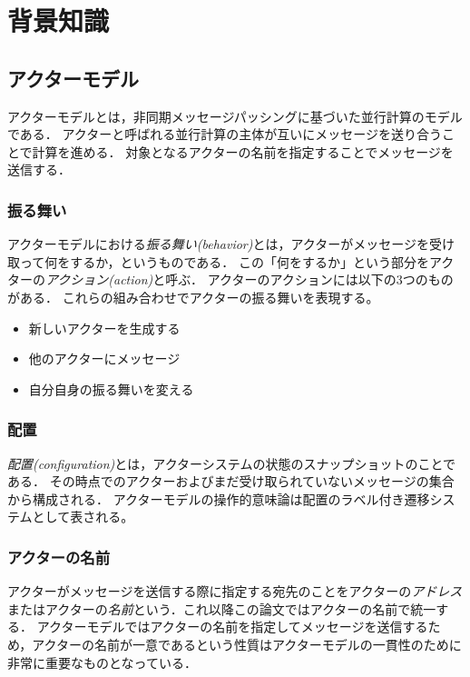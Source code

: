 \chapter{背景知識}
\label{chapter:background}

\section{アクターモデル}

アクターモデル\cite{Agha:1986aa}とは，非同期メッセージパッシングに基づいた並行計算のモデルである．
アクターと呼ばれる並行計算の主体が互いにメッセージを送り合うことで計算を進める．
対象となるアクターの名前を指定することでメッセージを送信する．


\subsection{振る舞い}

アクターモデルにおける\emph{振る舞い(behavior)}とは，アクターがメッセージを受け取って何をするか，というものである．
この「何をするか」という部分をアクターの\emph{アクション(action)}と呼ぶ．
アクターのアクションには以下の3つのものがある．
これらの組み合わせでアクターの振る舞いを表現する。

\begin{itemize}
\item 新しいアクターを生成する
\item 他のアクターにメッセージ
\item 自分自身の振る舞いを変える
\end{itemize}


\subsection{配置}

\emph{配置(configuration)}とは，アクターシステムの状態のスナップショットのことである．
その時点でのアクターおよびまだ受け取られていないメッセージの集合から構成される．
アクターモデルの操作的意味論は配置のラベル付き遷移システムとして表される。

\subsection{アクターの名前}

アクターがメッセージを送信する際に指定する宛先のことをアクターの\emph{アドレス}またはアクターの\emph{名前}という．これ以降この論文ではアクターの名前で統一する．
アクターモデルではアクターの名前を指定してメッセージを送信するため，アクターの名前が一意であるという性質はアクターモデルの一貫性のために非常に重要なものとなっている．


